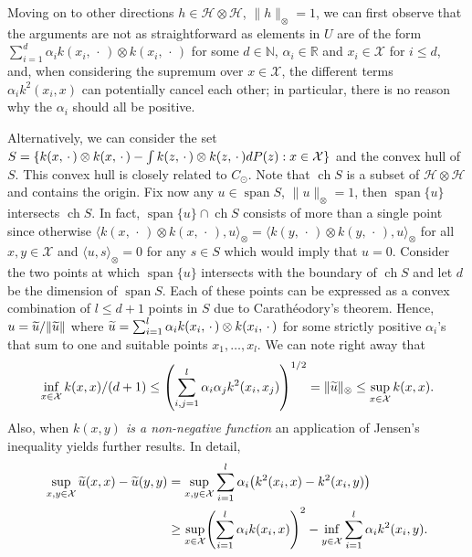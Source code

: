\documentclass[10pt]{amsart}
\theoremstyle{definition}\newtheorem{defi}[theo]{Definition}\newtheorem{rema}[theo]{Remark}\newtheorem{exam}[theo]{Example}\newtheorem{exem}[theo]{Example}\newtheorem{nota}[theo]{Notation}
\theoremstyle{remark}
\DeclareMathOperator*{\infd}{inf\vphantom{p}}
\DeclareMathOperator{\ch}{ch}
\DeclareMathOperator{\spn}{span}
\newcommand{\R}{\mathbb{R}}
\newcommand{\bbN}{\mathbb{N}}
\newcommand{\X}{\mathcal{X}}
\newcommand{\cH}{\mathcal{H}}
\let\oldtilde\tilde
\renewcommand*{\tilde}[1]{\mathchoice{\widetilde{#1}}{\widetilde{#1}}{\oldtilde{#1}}{\oldtilde{#1}}}
\let\originalleft\left
\let\originalright\right
\renewcommand{\left}{\mathopen{}\mathclose\bgroup\originalleft}
\renewcommand{\right}{\aftergroup\egroup\originalright}
\begin{document}
Moving on to other directions $h \in \cH \otimes \cH$, $\|h\|_\otimes = 1$, we can first observe that the arguments are not as straightforward as elements in $U$ are of the form $\sum_{i=1}^d \alpha_i k(x_i,\,\cdot\,) \otimes k(x_i,\,\cdot\,)$ for some $d\in \bbN$, $\alpha_i \in \R$ and $x_i \in \X$ for $i\leq d$, and, when considering the supremum over $x \in \X$, the different terms $\alpha_i k^2(x_i,x)$ can potentially cancel each other; in particular, there is no reason why the $\alpha_i$ should all be positive.



Alternatively, we can consider the set $S= \{k(x,\,\cdot\,) \otimes k(x,\,\cdot\,) - \int k(z,\,\cdot\,) \otimes k(z,\,\cdot\,)\linebreak dP(z) : x \in \X\}$ and the convex hull of $S$. This convex hull is closely related to $C_\odot$. Note that $\ch S$ is a subset of $\cH \otimes \cH$ and contains the origin. Fix now any $u\in \spn S$, $\|u\|_\otimes = 1$, then $\spn \{u\}$ intersects $\ch S$. In fact, $\spn \{u\} \cap \ch S$ consists of more than a single point since otherwise $\langle k(x,\,\cdot\,) \otimes k(x,\,\cdot\,), u \rangle_\otimes = \langle k(y,\,\cdot\,) \otimes k(y,\,\cdot\,), u \rangle_\otimes $ for all $x,y \in \X$ and $\langle u, s \rangle_\otimes =0$ for any $s \in S$ which would imply that $u = 0$. Consider the two points at which $\spn \{u\}$ intersects with the boundary of $\ch S$ and let $d$ be the dimension of $\spn S$. Each of these points can be expressed as a convex combination of $ l\leq d+1$ points in $S$ due to Carathéodory's theorem. Hence, $u = \tilde u/\|\tilde u\|$ where $\tilde u = \sum_{i=1}^{l} \alpha_i k(x_i,\,\cdot\,) \otimes k(x_i,\,\cdot\,)$ for some strictly positive $\alpha_i$'s that sum to one and suitable points $x_1,\dots, x_{l}$. We can note right away that
\begin{equation}\label{eq:bnds_on_u}
\inf_{x\in \X} k(x,x) /(d+1) \leq \left(\sum_{i,j=1}^{l} \alpha_i \alpha_j k^2(x_i,x_j) \right)^{1/2} =
\|\tilde u \|_\otimes \leq \sup_{x\in \X} k(x,x).
\end{equation}
Also, when \emph{$k(x,y)$ is a non-negative function} an application of Jensen's inequality yields further results. In detail,
\begin{align*}
\sup_{x,y \in \X} \tilde u(x,x) - \tilde u(y,y) &= \sup_{x,y \in \X} \sum_{i=1}^{l} \alpha_i \left(k^2(x_i,x) - k^2(x_i,y)\right) \\
&\geq \sup_{x \in \X} \left( \sum_{i=1}^{l} \alpha_i k(x_i,x) \right)^2 - \infd_{y \in \X} \sum_{i=1}^{l} \alpha_i k^2(x_i,y).
\end{align*}
\end{document}
